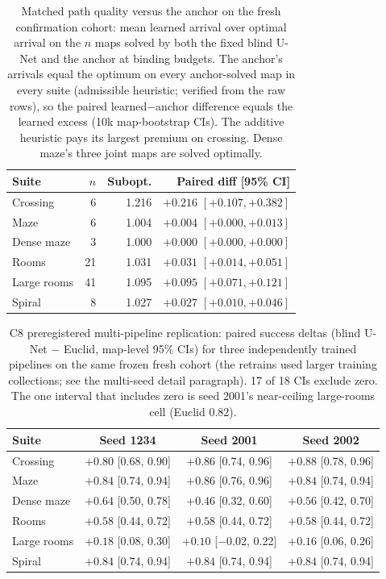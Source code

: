 \documentclass[letterpaper]{article} %
\newcommand{\stage}[1]{\textsc{#1}}
\begin{document}
\begin{table}[t]
\centering
\small
\begin{tabular}{@{}lrrr@{}}
\toprule
Suite & $n$ & Subopt. & Paired diff [95\% CI] \\
\midrule
Crossing & 6 & 1.216 & $+0.216$ $[+0.107,+0.382]$ \\
Maze & 6 & 1.004 & $+0.004$ $[+0.000,+0.013]$ \\
Dense maze & 3 & 1.000 & $+0.000$ $[+0.000,+0.000]$ \\
Rooms & 21 & 1.031 & $+0.031$ $[+0.014,+0.051]$ \\
Large rooms & 41 & 1.095 & $+0.095$ $[+0.071,+0.121]$ \\
Spiral & 8 & 1.027 & $+0.027$ $[+0.010,+0.046]$ \\
\bottomrule
\end{tabular}
\caption{Matched path quality versus the anchor on the fresh confirmation cohort: mean learned arrival over optimal arrival on the $n$ maps solved by both the fixed blind U-Net and the anchor at binding budgets. The anchor's arrivals equal the optimum on every anchor-solved map in every suite (admissible heuristic; verified from the raw rows), so the paired learned$-$anchor difference equals the learned excess (10k map-bootstrap CIs). The additive heuristic pays its largest premium on crossing. Dense maze's three joint maps are solved optimally.}
\label{tab:pathq}
\end{table}

\begin{table}[t]
\centering
\small
\setlength{\tabcolsep}{2.6pt}
\begin{tabular}{@{}lccc@{}}
\toprule
Suite & Seed 1234 & Seed 2001 & Seed 2002 \\
\midrule
Crossing & $+0.80$ [0.68, 0.90] & $+0.86$ [0.74, 0.96] & $+0.88$ [0.78, 0.96] \\
Maze & $+0.84$ [0.74, 0.94] & $+0.86$ [0.76, 0.96] & $+0.84$ [0.74, 0.94] \\
Dense maze & $+0.64$ [0.50, 0.78] & $+0.46$ [0.32, 0.60] & $+0.56$ [0.42, 0.70] \\
Rooms & $+0.58$ [0.44, 0.72] & $+0.58$ [0.44, 0.72] & $+0.58$ [0.44, 0.72] \\
Large rooms & $+0.18$ [0.08, 0.30] & $+0.10$ [$-$0.02, 0.22] & $+0.16$ [0.06, 0.26] \\
Spiral & $+0.84$ [0.74, 0.94] & $+0.84$ [0.74, 0.94] & $+0.84$ [0.74, 0.94] \\
\bottomrule
\end{tabular}
\caption{\stage{C8} preregistered multi-pipeline replication: paired success deltas (blind U-Net $-$ Euclid, map-level 95\% CIs) for three independently trained pipelines on the same frozen fresh cohort (the retrains used larger training collections; see the multi-seed detail paragraph). 17 of 18 CIs exclude zero. The one interval that includes zero is seed 2001's near-ceiling large-rooms cell (Euclid 0.82).}
\label{tab:c8seeds}
\end{table}
\end{document}
